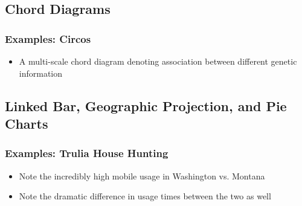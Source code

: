 \documentclass{beamer}
\begin{document}
\subsection{Chord Diagrams}


\begin{frame}
\frametitle{Examples: Circos}
\begin{itemize}
\item A multi-scale chord diagram denoting association between different genetic information
\end{itemize}
\end{frame}


\subsection{Linked Bar, Geographic Projection, and Pie Charts}


\begin{frame}
\frametitle{Examples: Trulia House Hunting}
\begin{itemize}
\item Note the incredibly high mobile usage in Washington vs. Montana
\item Note the dramatic difference in usage times between the two as well
\end{itemize}
\end{frame}
\end{document}
